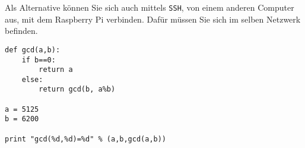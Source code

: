 \documentclass[12pt]{article}
\begin{document}
Als Alternative können Sie sich auch mittels \texttt{SSH},
von einem anderen Computer aus, mit dem Raspberry Pi verbinden. Dafür müssen Sie
sich im selben Netzwerk befinden. 



\begin{lstlisting}
def gcd(a,b):
    if b==0:
        return a
    else:
        return gcd(b, a%b)

a = 5125
b = 6200

print "gcd(%d,%d)=%d" % (a,b,gcd(a,b))
\end{lstlisting}
\end{document}
